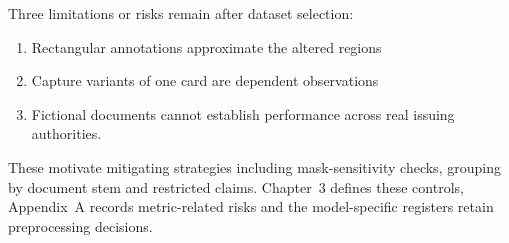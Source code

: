 

Three limitations or risks remain after dataset selection:
\begin{enumerate}
    \item Rectangular annotations approximate the altered regions
    \item Capture variants of one card are dependent observations
    \item Fictional documents cannot establish performance across real issuing authorities.
\end{enumerate}

These motivate mitigating strategies including mask-sensitivity checks, grouping by document stem and restricted claims. Chapter~3 defines these controls, Appendix~A records metric-related risks and the model-specific registers retain preprocessing decisions.


